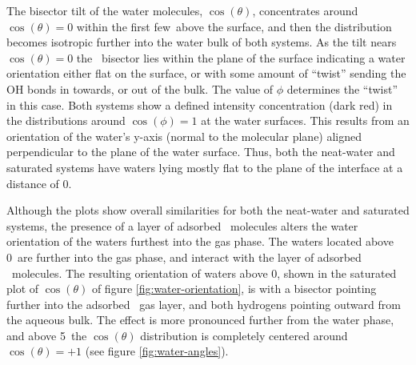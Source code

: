 The bisector tilt of the water molecules, $\cos(\theta)$, concentrates around $\cos(\theta)=0$ within the first few\angs~above the surface, and then the distribution becomes isotropic further into the water bulk of both systems. As the tilt nears $\cos(\theta)=0$ the \wat~bisector lies within the plane of the surface indicating a water orientation either flat on the surface, or with some amount of ``twist'' sending the OH bonds in towards, or out of the bulk. The value of $\phi$ determines the ``twist'' in this case. Both systems show a defined intensity concentration (dark red) in the distributions around $\cos(\phi)=1$ at the water surfaces. This results from an orientation of the water's y-axis (normal to the molecular plane) aligned perpendicular to the plane of the water surface. Thus, both the neat-water and saturated systems have waters lying mostly flat to the plane of the interface at a distance of 0\angs.

Although the plots show overall similarities for both the neat-water and saturated systems, the presence of a layer of adsorbed \suldiox~molecules alters the water orientation of the waters furthest into the gas phase. The waters located above 0\angs~are further into the gas phase, and interact with the layer of adsorbed \suldiox~molecules. The resulting orientation of waters above 0\angs, shown in the saturated plot of $\cos(\theta)$ of figure \ref{fig:water-orientation}, is with a bisector pointing further into the adsorbed \suldiox~gas layer, and both hydrogens pointing outward from the aqueous bulk. The effect is more pronounced further from the water phase, and above 5\angs~the $\cos(\theta)$ distribution is completely centered around $\cos(\theta)=+1$ (see figure \ref{fig:water-angles}).


